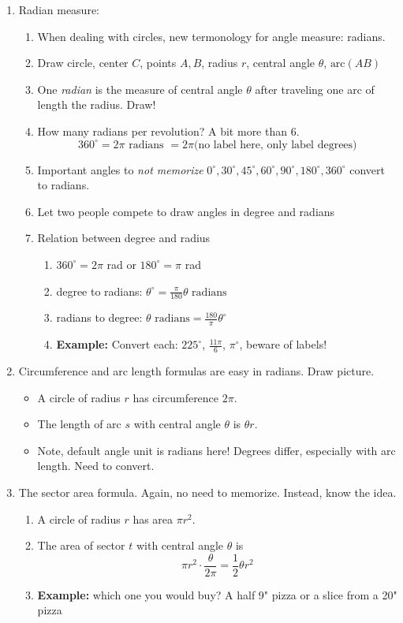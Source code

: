 \documentclass{article}
\begin{document}
\begin{enumerate}
\item Radian measure: 
\begin{enumerate}
\item When dealing with circles, new termonology for angle measure: radians.
\item Draw circle, center $C$, points $A,B$, radius $r$, central angle $\theta$, $\text{arc}(AB)$
\item One \emph{radian} is the measure of central angle $\theta$ after traveling one arc of length the radius. Draw!
\item How many radians per revolution? A bit more than 6.
\[
360^{\circ} = 2\pi \text{ radians } = 2\pi \text{(no label here, only label degrees)}
\]
\item Important angles to \emph{not memorize} $0^{\circ}, 30^{\circ}, 45^{\circ}, 60^{\circ}, 90^{\circ}, 180^{\circ}, 360^{\circ}$ convert to radians.
\item Let two people compete to draw angles in degree and radians
\item Relation between degree and radius
\begin{enumerate}
\item $360^\circ = 2\pi$ rad or $180^\circ = \pi$ rad
\item degree to radians: $\theta^{\circ} = \frac{\pi}{180}\theta \text{ radians}$
\item radians to degree: $\theta \text{ radians} = \frac{180}{\pi} \theta^{\circ}$\\
\item {\bf Example:} Convert each: $225^\circ$, $\frac{11\pi}{6}$, $\pi^\circ$, beware of labels!
\end{enumerate}
\end{enumerate}

\item Circumference and arc length formulas are easy in radians. Draw picture.
\begin{itemize}
\item A circle of radius $r$ has circumference $2\pi$.
\item The length of arc $s$ with central angle $\theta$ is $\theta r$.
\item Note, default angle unit is radians here! Degrees differ, especially with arc length. Need to convert.
\end{itemize}

\item The sector area formula. Again, no need to memorize. Instead, know the idea.
\begin{enumerate}
\item A circle of radius $r$ has area $\pi r^2$.
\item The area of sector $t$ with central angle $\theta$ is 
\[\pi r^2 \cdot \frac{\theta}{2\pi} = \frac{1}{2}\theta r^2\]
\item {\bf Example:} which one you would buy? A half 9" pizza or a slice from a 20" pizza
\end{enumerate}


\end{enumerate}
\end{document}
